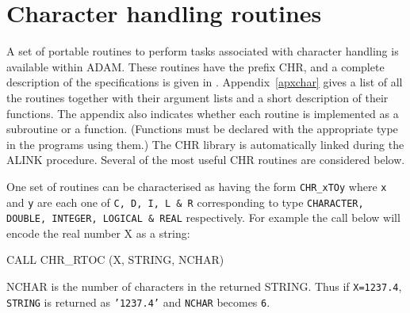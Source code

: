 \documentclass[twoside,11pt,nolof]{starlink}
\begin{document}
\newpage
\section{Character handling routines\label{char}}

A set of portable routines to perform tasks associated with
character handling is available within ADAM.
These routines have the prefix CHR, and a complete description of the
specifications is given in .
Appendix~\ref{apxchar} gives a list of all the routines together with
their argument lists and a short description of their functions.
The appendix also indicates
whether  each routine is implemented as a subroutine or a function.
(Functions must be declared with the appropriate type in the programs using
them.)
The CHR library is automatically linked during the ALINK procedure.
Several of the most useful CHR routines are considered below.

One set of routines can be characterised as having the form
\texttt{CHR\_xTOy} where \texttt{x} and \texttt{y} are each  one
of \texttt{C, D, I, L \& R} corresponding to type
\texttt{CHARACTER, DOUBLE, INTEGER, LOGICAL \& REAL} respectively.
For example the call below will encode the  real number X as a string:
\begin{terminalv}
      CALL CHR_RTOC (X, STRING, NCHAR)
\end{terminalv}
NCHAR is the number of characters in the returned STRING.
Thus if \texttt{X=1237.4}, \texttt{STRING} is returned as {\tt'1237.4'}
and \texttt{NCHAR} becomes \texttt{6}.
\end{document}
